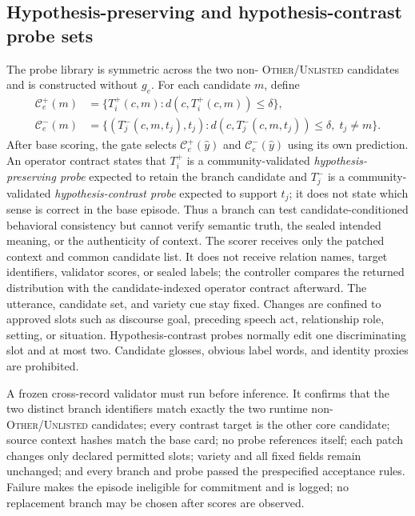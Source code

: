\documentclass[preprint,12pt,authoryear]{elsarticle}
\begin{document}
\subsection{Hypothesis-preserving and hypothesis-contrast probe sets}

The probe library is symmetric across the two non-
\textsc{Other/Unlisted} candidates and is constructed without $g_e$. For each
candidate $m$, define
\begin{align}
\mathcal{C}^{+}_e(m)
 &=\{T_i^+(c,m):d(c,T_i^+(c,m))\leq\delta\},\\
\mathcal{C}^{-}_e(m)
 &=\{(T_j^-(c,m,t_j),t_j):d(c,T_j^-(c,m,t_j))\leq\delta,
 \;t_j\ne m\}.
\end{align}
After base scoring, the gate selects $\mathcal{C}^{+}_e(\hat y)$ and
$\mathcal{C}^{-}_e(\hat y)$ using its own prediction. An operator contract
states that $T_i^+$ is a community-validated \emph{hypothesis-preserving
probe} expected to retain the branch candidate and $T_j^-$ is a
community-validated \emph{hypothesis-contrast probe} expected to support
$t_j$; it does not state which sense is correct in the base episode. Thus a
branch can test candidate-conditioned behavioral consistency but cannot verify
semantic truth, the sealed intended meaning, or the authenticity of context.
The scorer receives only the patched context and common candidate list. It
does not receive relation names, target identifiers, validator scores, or
sealed labels; the controller compares the returned distribution with the
candidate-indexed operator contract afterward.
The utterance, candidate set, and variety cue stay fixed. Changes are confined
to approved slots such as discourse goal, preceding speech act, relationship
role, setting, or situation. Hypothesis-contrast probes normally edit one
discriminating slot and at most two. Candidate glosses, obvious label words,
and identity proxies are prohibited.

A frozen cross-record validator must run before inference. It confirms that
the two distinct branch identifiers match exactly the two runtime
non-\textsc{Other/Unlisted} candidates; every contrast target is the other
core candidate; source context hashes match the base card; no probe references
itself; each patch changes only declared permitted slots; variety and all
fixed fields remain unchanged; and every branch and probe passed the
prespecified acceptance rules. Failure makes the episode ineligible for
commitment and is logged; no replacement branch may be chosen after scores are
observed.
\end{document}
